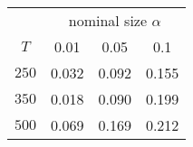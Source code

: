 % 

\renewcommand{\arraystretch}{1.2}
\begin{tabular}{cccc}
\hline
      & \multicolumn{3}{c}{nominal size $\alpha$} \\
$T$   & 0.01 & 0.05 & 0.1 \\ 
\hline
$250$ & 0.032 & 0.092 & 0.155 \\ 
$350$ & 0.018 & 0.090 & 0.199 \\ 
$500$ & 0.069 & 0.169 & 0.212 \\ 
\hline
\end{tabular}
